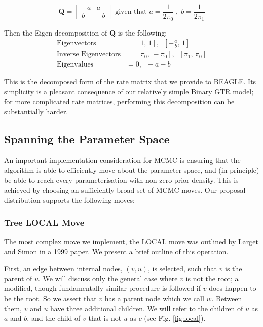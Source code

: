 \documentclass[10pt,journal,compsoc]{IEEEtran}
\begin{document}
\begin{equation}
    \textbf{Q} = \begin{bmatrix}
-a & a\\
b & -b
\end{bmatrix} \text{ \ given that \ } a = \frac{1}{2 \pi_0} \;,\; b = \frac{1}{2 \pi_1}
\end{equation}

\noindent Then the Eigen decomposition of \textbf{Q} is the following:
\begin{align*}
    \text{Eigenvectors} &= [1,\, 1],\;\;  [-\frac{a}{b},\, 1] \\
    \text{Inverse Eigenvectors} &= [\pi_0,\, -\pi_0],\;\;  [\pi_1,\, \pi_0]\\
    \text{Eigenvalues} &= 0,\;\; -a-b
\end{align*}

This is the decomposed form of the rate matrix that we provide to BEAGLE. Its simplicity is a pleasant consequence of our relatively simple Binary GTR model; for more complicated rate matrices, performing this decomposition can be substantially harder.

\subsection{Spanning the Parameter Space}

An important implementation consideration for MCMC is ensuring that the algorithm is able to efficiently move about the parameter space, and (in principle) be able to reach every parameterisation with non-zero prior density. This is achieved by choosing an sufficiently broad set of MCMC moves. Our proposal distribution supports the following moves:

\subsubsection{Tree LOCAL Move}

The most complex move we implement, the LOCAL move was outlined by Larget and Simon in a 1999 paper\cite{larget1999markov}. We present a brief outline of this operation.

First, an edge between internal nodes, $(v, u)$, is selected, such that $v$ is the parent of $u$. We will discuss only the general case where $v$ is not the root; a modified, though fundamentally similar procedure is followed if $v$ does happen to be the root. So we assert that $v$ has a parent node which we call $w$. Between them, $v$ and $u$ have three additional children. We will refer to the children of $u$ as $a$ and $b$, and the child of $v$ that is not $u$ as $c$ (see Fig. \ref{fig:local}).
\end{document}

